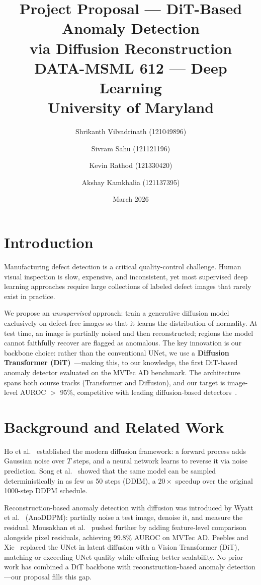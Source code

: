 \documentclass[12pt,a4paper]{article}
\title{%
  \textbf{Project Proposal --- DiT-Based Anomaly Detection\\via Diffusion Reconstruction}\\[6pt]
  \large DATA-MSML 612 --- Deep Learning\\
  University of Maryland
}
\author{Shrikanth Vilvadrinath (121049896) \and Sivram Sahu (121121196) \and Kevin Rathod (121330420) \and Akshay Kamkhalia (121137395)}
\date{March 2026}
\begin{document}
\maketitle

\section{Introduction}

Manufacturing defect detection is a critical quality-control challenge.
Human visual inspection is slow, expensive, and inconsistent, yet most supervised
deep learning approaches require large collections of labeled defect images that
rarely exist in practice.

We propose an \textit{unsupervised} approach: train a generative diffusion model
exclusively on defect-free images so that it learns the distribution of normality.
At test time, an image is partially noised and then reconstructed; regions the
model cannot faithfully recover are flagged as anomalous. The key innovation is
our backbone choice: rather than the conventional UNet, we use a
\textbf{Diffusion Transformer (DiT)}~\cite{peebles2023}---making this, to our
knowledge, the first DiT-based anomaly detector evaluated on the MVTec AD
benchmark. The architecture spans both course tracks (Transformer and Diffusion),
and our target is image-level AUROC $>$ 95\%, competitive with leading
diffusion-based detectors~\cite{mousakhan2023}.

\section{Background and Related Work}

Ho et al.~\cite{ho2020} established the modern diffusion framework: a forward
process adds Gaussian noise over $T$ steps, and a neural network learns to
reverse it via noise prediction. Song et al.~\cite{song2021} showed that the
same model can be sampled deterministically in as few as 50 steps (DDIM), a
$20\times$ speedup over the original 1000-step DDPM schedule.

Reconstruction-based anomaly detection with diffusion was introduced by
Wyatt et al.~\cite{wyatt2022} (AnoDDPM): partially noise a test image, denoise
it, and measure the residual. Mousakhan et al.~\cite{mousakhan2023} pushed
further by adding feature-level comparison alongside pixel residuals, achieving
99.8\% AUROC on MVTec AD. Peebles and Xie~\cite{peebles2023} replaced the UNet
in latent diffusion with a Vision Transformer (DiT), matching or exceeding UNet
quality while offering better scalability. No prior work has combined a DiT
backbone with reconstruction-based anomaly detection---our proposal fills this
gap.
\end{document}
